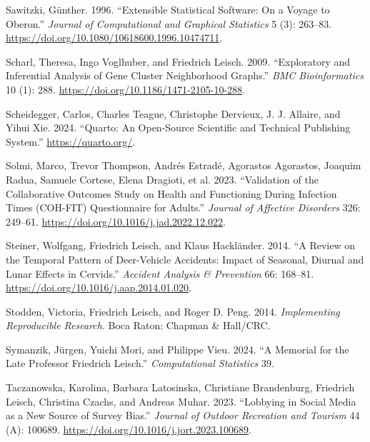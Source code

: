 \begin{CSLReferences}{1}{0}
\leavevmode{}%
Sawitzki, Günther. 1996. {``Extensible Statistical Software: On a Voyage to {O}beron.''} \emph{Journal of Computational and Graphical Statistics} 5 (3): 263--83. \url{https://doi.org/10.1080/10618600.1996.10474711}.

\leavevmode{}%
Scharl, Theresa, Ingo Voglhuber, and Friedrich Leisch. 2009. {``Exploratory and Inferential Analysis of Gene Cluster Neighborhood Graphs.''} \emph{BMC Bioinformatics} 10 (1): 288. \url{https://doi.org/10.1186/1471-2105-10-288}.

\leavevmode{}%
Scheidegger, Carlos, Charles Teague, Christophe Dervieux, J. J. Allaire, and Yihui Xie. 2024. {``{Q}uarto: {A}n Open-Source Scientific and Technical Publishing System.''} \url{https://quarto.org/}.

\leavevmode{}%
Solmi, Marco, Trevor Thompson, Andrés Estradé, Agorastos Agorastos, Joaquim Radua, Samuele Cortese, Elena Dragioti, et al. 2023. {``Validation of the {C}ollaborative {O}utcomes Study on {H}ealth and {F}unctioning During {I}nfection {T}imes (COH-FIT) Questionnaire for Adults.''} \emph{Journal of Affective Disorders} 326: 249--61. \url{https://doi.org/10.1016/j.jad.2022.12.022}.

\leavevmode{}%
Steiner, Wolfgang, Friedrich Leisch, and Klaus Hackländer. 2014. {``A Review on the Temporal Pattern of Deer-Vehicle Accidents: Impact of Seasonal, Diurnal and Lunar Effects in Cervids.''} \emph{Accident Analysis \& Prevention} 66: 168--81. \url{https://doi.org/10.1016/j.aap.2014.01.020}.

\leavevmode{}%
Stodden, Victoria, Friedrich Leisch, and Roger D. Peng. 2014. \emph{Implementing Reproducible Research}. Boca Raton: Chapman \& Hall/CRC.

\leavevmode{}%
Symanzik, Jürgen, Yuichi Mori, and Philippe Vieu. 2024. {``A Memorial for the Late {P}rofessor {F}riedrich {L}eisch.''} \emph{Computational Statistics} 39.

\leavevmode{}%
Taczanowska, Karolina, Barbara Latosinska, Christiane Brandenburg, Friedrich Leisch, Christina Czachs, and Andreas Muhar. 2023. {``Lobbying in Social Media as a New Source of Survey Bias.''} \emph{Journal of Outdoor Recreation and Tourism} 44 (A): 100689. \url{https://doi.org/10.1016/j.jort.2023.100689}.


\end{CSLReferences}
